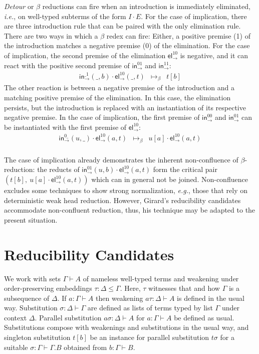 \documentclass[a4paper,USenglish,cleveref, autoref, thm-restate]{lipics-v2019}
\newcommand{\ie}{\emph{i.e.}\xspace}
\newcommand{\eg}{\emph{e.g.}\xspace}
\newcommand{\tin}{\ensuremath{\mathsf{in}}}
\newcommand{\inn}[2]{\tin_{#1}^{#2}}
\newcommand{\tel}{\mathsf{el}}
\newcommand{\el}[2]{\tel_{#1}^{#2}}
\newcommand{\contract}[1][]{\mapsto_{#1}}
\begin{document}
\emph{Detour} or $\beta$ reductions can fire when an introduction is
immediately eliminated, \ie, on well-typed subterms of the form $I
\cdot E$.  For the case of implication, there are three
introduction rule that can be paired with the only elimination rule.
There are two ways in which a $\beta$ redex can fire:  Either, a
positive premise (1) of the introduction matches a negative premise
(0) of the elimination.  For the case of implication, the second
premise of the elimination $\el\to{10}$
is negative, and it can react with the
positive second premise of $\inn\to{01}$ and $\inn\to{11}$:
\[
\begin{array}{lll}
  \inn\to{\_1}(\_,b) \cdot \el\to{10}(\_,t)
    & \contract[\beta] &
  t[b]
\end{array}
\]
The other reaction is between a negative premise of the introduction
and a matching positive premise of the elimination.  In this case, the
elimination persists, but the introduction is replaced with an
instantiation of its respective negative premise.  In the case of
implication, the first premise of $\inn\to{00}$ and $\inn\to{01}$ can
be instantiated with the first premise of $\el\to{10}$:
\[
\begin{array}{lll}
  \inn\to{0\_}(u,\_) \cdot \el\to{10}(a,t)
    & \contract[\beta] &
  u[a] \cdot \el\to{10}(a,t)
\\
\end{array}
\]

The case of implication already demonstrates the inherent
non-confluence of $\beta$-reduction: the reducts of
$\inn\to{01}(u,b) \cdot \el\to{10}(a,t)$ form the critical pair
$(t[b],\ u[a] \cdot \el\to{10}(a,t))$ which can in general not be
joined.  Non-confluence excludes some techniques to show strong
normalization, \eg, those that rely on deterministic weak head
reduction.  However, Girard's reducibility candidates accommodate
non-confluent reduction, thus, his technique may be adapted to the
present situation.

\section{Reducibility Candidates}
\label{sec:cr}

We work with sets $\Gamma \vdash A$ of nameless well-typed terms and
weakening under order-preserving embeddings
$\tau : \Delta \leq \Gamma$.  Here, $\tau$ witnesses that and how
$\Gamma$ is a subsequence of $\Delta$.  If $a : \Gamma \vdash A$ then
weakening $a\tau : \Delta \vdash A$ is defined in the usual way.
Substitution $\sigma : \Delta \vdash \Gamma$ are defined as lists of
terms typed by list $\Gamma$ under context $\Delta$.  Parallel
substitution $a\sigma : \Delta \vdash A$ for $a : \Gamma \vdash A$ be
defined as usual.  Substitutions compose with weakenings and
substitutions in the usual way, and singleton substitution $t[b]$ be
an instance for parallel substitution $t\sigma$ for a suitable
$\sigma : \Gamma \vdash \Gamma.B$ obtained from $b : \Gamma \vdash B$.
\end{document}

